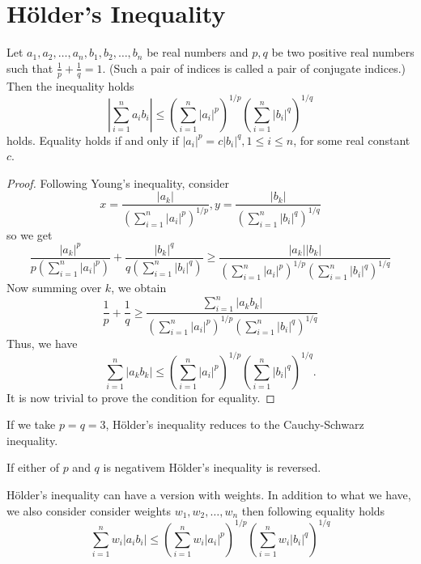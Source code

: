\section{H\"{o}lder's Inequality}
\begin{theorem}
  Let $a_1, a_2, \ldots, a_n, b_1, b_2, \ldots, b_n$ be real numbers and $p, q$ be two positive real numbers such that $\frac{1}{p}
  + \frac{1}{q} = 1.$ (Such a pair of indices is called a pair of conjugate indices.) Then the inequality holds
  \begin{equation}
    \left|\sum_{i=1}^na_ib_i\right|\leq\left(\sum_{i=1}^n|a_i|^p\right)^{1/p}\left(\sum_{i=1}^n|b_i|^q\right)^{1/q}
  \end{equation}
holds. Equality holds if and only if $|a_i|^p = c|b_i|^q, 1\leq i\leq n$, for some real constant $c$.
\end{theorem}

\begin{proof}
  Following Young's inequality, consider $$x = \frac{|a_k|}{\left(\sum_{i=1}^n|a_i|^p\right)^{1/p}}, y =
  \frac{|b_k|}{\left(\sum_{i=1}^n|b_i|^q\right)^{1/q}}$$
  so we get $$\frac{|a_k|^p}{p\left(\sum_{i=1}^n|a_i|^p\right)} +
  \frac{|b_k|^q}{q\left(\sum_{i=1}^n|b_i|^q\right)}\geq
  \frac{|a_k||b_k|}{\left(\sum_{i=1}^n|a_i|^p\right)^{1/p}\left(\sum_{i=1}^n|b_i|^q\right)^{1/q}}$$
  Now summing over $k$, we obtain
  $$\frac{1}{p} + \frac{1}{q}\geq
  \frac{\sum_{i=1}^n|a_kb_k|}{\left(\sum_{i=1}^n|a_i|^p\right)^{1/p}\left(\sum_{i=1}^n|b_i|^q\right)^{1/q}}$$
  Thus, we have
  $$\sum_{i=1}^n|a_kb_k|\leq \left(\sum_{i=1}^n|a_i|^p\right)^{1/p}\left(\sum_{i=1}^n|b_i|^q\right)^{1/q}.$$
  It is now trivial to prove the condition for equality.
\end{proof}

\begin{remark}
  If we take $p = q = 3$, H\"{o}lder's inequality reduces to the Cauchy-Schwarz inequality.
\end{remark}
\begin{remark}
  If either of $p$ and $q$ is negativem H\"{o}lder's inequality is reversed.
\end{remark}
\begin{remark}
  H\"{o}lder's inequality can have a version with weights. In addition to what we have, we also consider consider weights $w_1,
  w_2, \ldots, w_n$ then following equality holds
  $$\sum_{i=1}^nw_i|a_ib_i|\leq\left(\sum_{i=1}^nw_i|a_i|^p\right)^{1/p}\left(\sum_{i=1}^nw_i|b_i|^q\right)^{1/q}$$
\end{remark}

